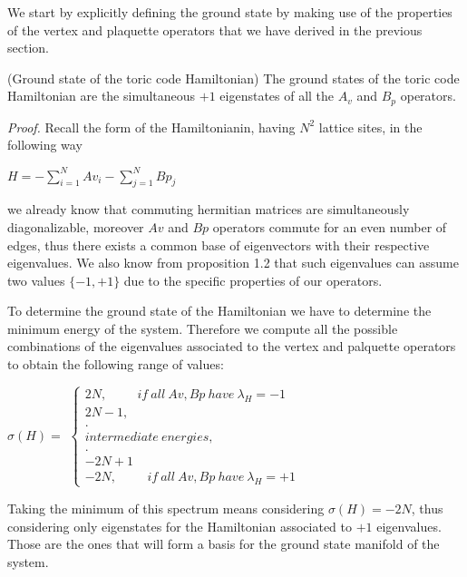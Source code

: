 \documentclass{Configuration_Files/PoliMi3i_thesis}
\begin{document}
We start by explicitly defining the ground state by making use of the properties of the vertex and plaquette operators that we have derived in the previous section.

\begin{proposition} (Ground state of the toric code Hamiltonian) The ground states of the toric code Hamiltonian are the simultaneous $+1$ eigenstates of all the $A_v$ and $B_p$ operators. 
\end{proposition}

\textit{Proof.}\newline 
Recall the form of the Hamiltonianin, having $N^2$ lattice sites, in the following way 

\begin{center}
	
	$H = -\sum_{i=1}^{N}
	Av_i - \sum_{j=1}^{N} Bp_j $
	
\end{center}

we already know that commuting hermitian matrices are simultaneously diagonalizable, moreover $Av$ and $Bp$ operators commute for an even number of edges, thus there exists a common base of eigenvectors with their respective eigenvalues. We also know from proposition 1.2 that such eigenvalues can assume two values $\{-1,+1\}$ due to the specific properties of our operators.

To determine the ground state of the Hamiltonian we have to determine the minimum energy of the system. Therefore we compute all the possible combinations of the eigenvalues associated to the vertex and palquette operators to obtain the following range of values:

\begin{center}
	$\sigma( H) =$
	$\begin{cases}
		2N, \hspace{1cm} if \ all\ Av,Bp \ have \ \lambda_{H}= -1\\
		2N-1,\\
		.\\
		intermediate \ energies,\\
		.\\
		-2N+1\\
		-2N, \hspace{1cm} if \ all \ Av,Bp \ have \ \lambda_{H}= +1
	\end{cases}$
	
\end{center}

Taking the minimum of this spectrum means considering $\sigma(H)=-2N$, thus considering only eigenstates for the Hamiltonian associated to $+1$ eigenvalues.
Those are the ones that will form a basis for the ground state manifold of the system.\newline
\end{document}
